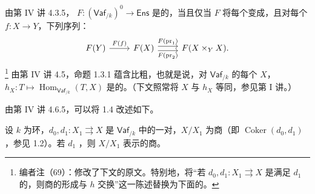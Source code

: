 由第 IV 讲 4.3.5， $F:(\mathsf{Vaf}_{/k})^0\to\mathsf{Ens}$ 是的，当且仅当 $F$ 将每个变成，且对每个 $f:X\to Y$，下列序列：
\[
\begin{tikzcd}
 F(Y)\arrow[r,"F(f)"]&F(X)\arrow[r,shift left=.6ex,"F(\operatorname{pr}_1)"]\arrow[r,shift right=.6ex,"F(\operatorname{pr}_2)"']&F(X\times_Y X).
\end{tikzcd}
\]
\footnote{编者注（69）：修改了下文的原文。特别地，将“若 $d_0,d_1:X_1\rightrightarrows X$ 是满足 $d_1$ 的，则商的形成与 $h$ 交换”这一陈述替换为下面的。} 由第 IV 讲 4.5，命题 1.3.1 蕴含比粗，也就是说，对 $\mathsf{Vaf}_{/k}$ 的每个 $X$， $h_X:T\mapsto\operatorname{Hom}_{\mathsf{Vaf}_{/k}}(T,X)$ 是的。（下文照常将 $X$ 与 $h_X$ 等同，参见第 I 讲。）

由第 IV 讲 4.6.5，可以将 1.4 改述如下。
\begin{SGAresult}{}{}
设 $k$ 为环，$d_0,d_1:X_1\rightrightarrows X$ 是 $\mathsf{Vaf}_{/k}$ 中的一对，$X/X_1$ 为商（即 $\operatorname{Coker}(d_0,d_1)$，参见 1.2）。若 $d_1$ ，则 $X/X_1$ 表示的商。
\end{SGAresult}

